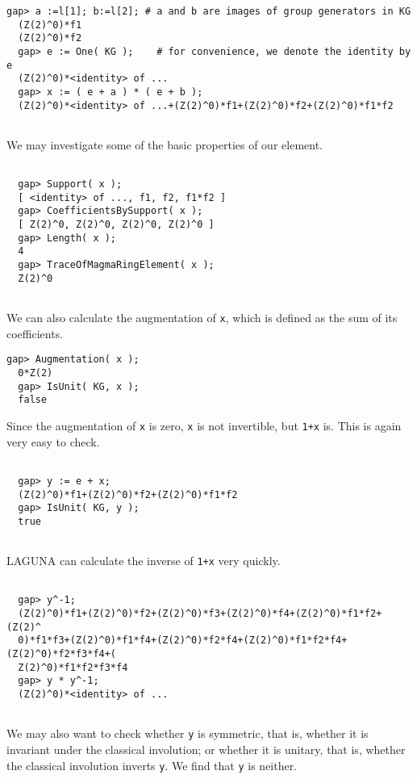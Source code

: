 \documentclass[a4paper,11pt]{report}
\begin{document}
{\begin{Verbatim}[fontsize=\small,frame=single,label=Example]
  gap> a :=l[1]; b:=l[2]; # a and b are images of group generators in KG
  (Z(2)^0)*f1
  (Z(2)^0)*f2
  gap> e := One( KG );    # for convenience, we denote the identity by e
  (Z(2)^0)*<identity> of ...
  gap> x := ( e + a ) * ( e + b ); 
  (Z(2)^0)*<identity> of ...+(Z(2)^0)*f1+(Z(2)^0)*f2+(Z(2)^0)*f1*f2  
  
\end{Verbatim}
 We may investigate some of the basic properties of our element. 
\begin{Verbatim}[fontsize=\small,frame=single,label=Example]
  
  gap> Support( x );
  [ <identity> of ..., f1, f2, f1*f2 ]
  gap> CoefficientsBySupport( x );
  [ Z(2)^0, Z(2)^0, Z(2)^0, Z(2)^0 ]
  gap> Length( x );
  4
  gap> TraceOfMagmaRingElement( x );
  Z(2)^0
  
\end{Verbatim}
 We can also calculate the augmentation of \texttt{x}, which is defined as the sum of its coefficients. 
\begin{Verbatim}[fontsize=\small,frame=single,label=Example]
  gap> Augmentation( x );
  0*Z(2)
  gap> IsUnit( KG, x );
  false
\end{Verbatim}
 Since the augmentation of \texttt{x} is zero, \texttt{x} is not invertible, but \texttt{1+x} is. This is again very easy to check. 
\begin{Verbatim}[fontsize=\small,frame=single,label=Example]
  
  gap> y := e + x;
  (Z(2)^0)*f1+(Z(2)^0)*f2+(Z(2)^0)*f1*f2
  gap> IsUnit( KG, y );
  true  
  
\end{Verbatim}
 \textsf{LAGUNA} can calculate the inverse of \texttt{1+x} very quickly. 
\begin{Verbatim}[fontsize=\small,frame=single,label=Example]
  
  gap> y^-1;
  (Z(2)^0)*f1+(Z(2)^0)*f2+(Z(2)^0)*f3+(Z(2)^0)*f4+(Z(2)^0)*f1*f2+(Z(2)^
  0)*f1*f3+(Z(2)^0)*f1*f4+(Z(2)^0)*f2*f4+(Z(2)^0)*f1*f2*f4+(Z(2)^0)*f2*f3*f4+(
  Z(2)^0)*f1*f2*f3*f4
  gap> y * y^-1;
  (Z(2)^0)*<identity> of ... 
  
\end{Verbatim}
 We may also want to check whether \texttt{y} is symmetric, that is, whether it is invariant under the classical involution;
or whether it is unitary, that is, whether the classical involution inverts \texttt{y}. We find that \texttt{y} is neither. 
\begin{Verbatim}[fontsize=\small,frame=single,label=Example]
  

\end{Verbatim}}
\end{document}
